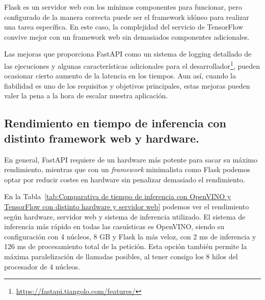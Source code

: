 Flask es un servidor web con los mínimos componentes para funcionar, pero configurado de la manera correcta puede ser el framework idóneo para realizar una tarea específica.
En este caso, la complejidad del servicio de TensorFlow convive mejor con un framework web sin demasiados componentes adicionales.

Las mejoras que proporciona FastAPI como un sistema de logging detallado de las ejecuciones y algunas características adicionales para el desarrollador\footnote{\url{https://fastapi.tiangolo.com/features/}}, pueden ocasionar cierto aumento de la latencia en los tiempos.
Aun así, cuando la fiabilidad es uno de los requisitos y objetivos principales, estas mejoras pueden valer la pena a la hora de escalar nuestra aplicación.

\subsection{Rendimiento en tiempo de inferencia con distinto framework web y hardware.}
En general, FastAPI requiere de un hardware más potente para sacar su máximo rendimiento, mientras que con un \textit{framework} minimalista como Flask podemos optar por reducir costes en hardware sin penalizar demasiado el rendimiento.

En la Tabla~\ref{tab:Comparativa de tiempo de inferencia con OpenVINO y TensorFlow con distinto hardware y servidor web} podemos ver el rendimiento según hardware, servidor web y sistema de inferencia utilizado.
El sistema de inferencia más rápido en todas las casuísticas es OpenVINO, siendo su configuración con 4 núcleos, 8 GB y Flask la más veloz, con 2 ms de inferencia y 126 ms de procesamiento total de la petición. Esta opción también permite la máxima paralelización de llamadas posibles, al tener consigo los 8 hilos del procesador de 4 núcleos.

